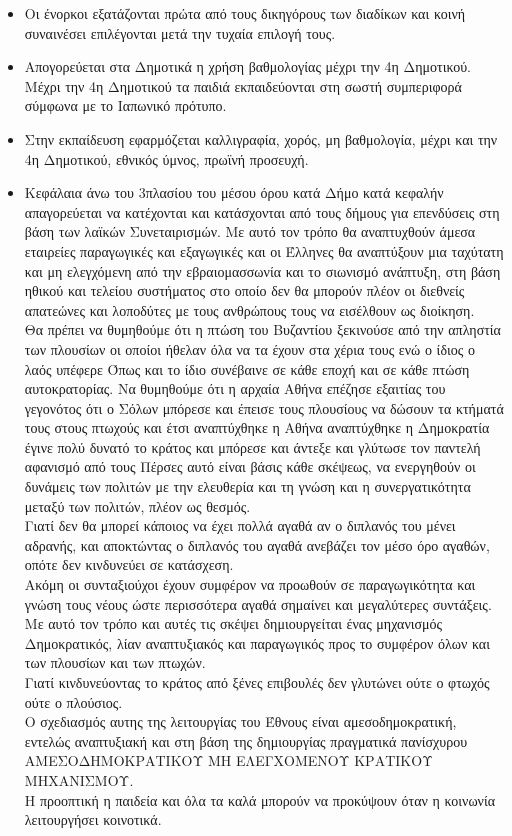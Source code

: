 \documentclass[a4paper]{article}
\begin{document}
\begin{itemize}
\item  Οι ένορκοι εξατάζονται πρώτα από τους δικηγόρους των διαδίκων και κοινή συναινέσει επιλέγονται μετά την τυχαία επιλογή τους.
\item  Απογορεύεται στα Δημοτικά η χρήση βαθμολογίας μέχρι την 4η Δημοτικού. Μέχρι την 4η Δημοτικού τα παιδιά εκπαιδεύονται στη σωστή συμπεριφορά σύμφωνα με το Ιαπωνικό πρότυπο.
\item  Στην εκπαίδευση εφαρμόζεται καλλιγραφία, χορός, μη βαθμολογία, μέχρι και την 4η Δημοτικού, εθνικός ύμνος, πρωϊνή προσευχή.
\item  Κεφάλαια άνω του 3πλασίου του μέσου όρου κατά Δήμο κατά κεφαλήν απαγορεύεται να κατέχονται και κατάσχονται από τους δήμους για επενδύσεις στη βάση των λαϊκών Συνεταιρισμών. Με αυτό τον τρόπο θα αναπτυχθούν άμεσα εταιρείες παραγωγικές και εξαγωγικές και οι Έλληνες θα αναπτύξουν μια ταχύτατη και μη ελεγχόμενη από την εβραιομασσωνία και το σιωνισμό ανάπτυξη, στη βάση ηθικού και τελείου συστήματος στο οποίο δεν θα μπορούν πλέον οι διεθνείς απατεώνες και λοποδύτες με τους ανθρώπους τους να εισέλθουν ως διοίκηση. \\ Θα πρέπει να θυμηθούμε ότι η πτώση του Βυζαντίου ξεκινούσε από την απληστία των πλουσίων οι οποίοι ήθελαν όλα να τα έχουν στα χέρια τους ενώ ο ίδιος ο λαός υπέφερε Όπως και το ίδιο συνέβαινε σε κάθε εποχή και σε κάθε πτώση αυτοκρατορίας. Να θυμηθούμε ότι η αρχαία Αθήνα επέζησε εξαιτίας του γεγονότος ότι ο Σόλων μπόρεσε και έπεισε τους πλουσίους να δώσουν τα κτήματά τους 
στους πτωχούς και έτσι αναπτύχθηκε η Αθήνα αναπτύχθηκε η Δημοκρατία έγινε πολύ δυνατό το κράτος και μπόρεσε και άντεξε και γλύτωσε τον παντελή αφανισμό από τους Πέρσες αυτό είναι βάσις κάθε σκέψεως, να ενεργηθούν οι δυνάμεις των πολιτών με την ελευθερία και τη γνώση και η συνεργατικότητα μεταξύ των πολιτών, πλέον ως θεσμός. \\ Γιατί δεν θα μπορεί κάποιος να έχει πολλά αγαθά αν ο διπλανός του μένει αδρανής, και αποκτώντας ο διπλανός του αγαθά ανεβάζει τον μέσο όρο αγαθών, οπότε δεν κινδυνεύει σε κατάσχεση. \\Ακόμη οι συνταξιούχοι έχουν συμφέρον να προωθούν σε παραγωγικότητα και γνώση τους νέους ώστε περισσότερα αγαθά σημαίνει και μεγαλύτερες συντάξεις.\\Με αυτό τον τρόπο και αυτές τις σκέψει δημιουργείται ένας μηχανισμός Δημοκρατικός, λίαν αναπτυξιακός και παραγωγικός προς το συμφέρον όλων και των πλουσίων και των πτωχών.\\ Γιατί κινδυνεύοντας το κράτος από ξένες επιβουλές δεν γλυτώνει ούτε ο φτωχός ούτε ο πλούσιος. \\ Ο σχεδιασμός αυτης της λειτουργίας του Έθνους είναι αμεσοδημοκρατική, εντελώς αναπτυξιακή και στη βάση της δημιουργίας πραγματικά πανίσχυρου ΑΜΕΣΟΔΗΜΟΚΡΑΤΙΚΟΥ ΜΗ ΕΛΕΓΧΟΜΕΝΟΥ ΚΡΑΤΙΚΟΥ ΜΗΧΑΝΙΣΜΟΥ.\\Η προοπτική η παιδεία και όλα τα καλά μπορούν να προκύψουν όταν η κοινωνία λειτουργήσει κοινοτικά.

\end{itemize}
\end{document}
